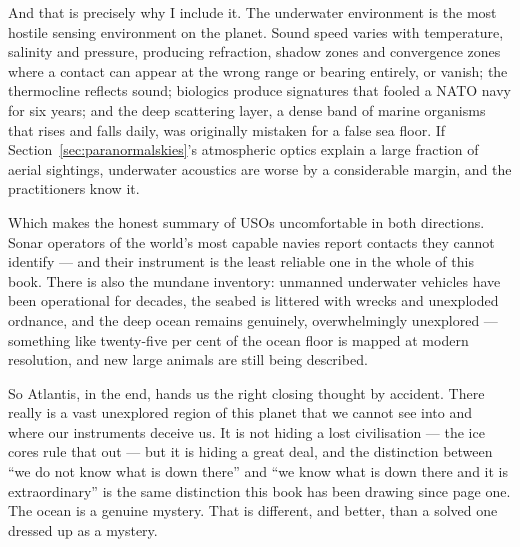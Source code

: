 And that is precisely why I include it. The underwater environment is the most hostile sensing
environment on the planet. Sound speed varies with temperature, salinity and pressure, producing
refraction, shadow zones and convergence zones where a contact can appear at the wrong range or
bearing entirely, or vanish; the thermocline reflects sound; biologics produce signatures that fooled
a NATO navy for six years; and the deep scattering layer, a dense band of marine organisms that rises
and falls daily, was originally mistaken for a false sea floor. If Section~\ref{sec:paranormalskies}'s atmospheric optics
explain a large fraction of aerial sightings, underwater acoustics are worse by a considerable margin,
and the practitioners know it.

Which makes the honest summary of USOs uncomfortable in both directions. Sonar operators of the
world's most capable navies report contacts they cannot identify --- and their instrument is the least
reliable one in the whole of this book. There is also the mundane inventory: unmanned underwater
vehicles have been operational for decades, the seabed is littered with wrecks and unexploded
ordnance, and the deep ocean remains genuinely, overwhelmingly unexplored --- something like
twenty-five per cent of the ocean floor is mapped at modern resolution, and new large animals are
still being described.

So Atlantis, in the end, hands us the right closing thought by accident. There really is a vast
unexplored region of this planet that we cannot see into and where our instruments deceive us. It is
not hiding a lost civilisation --- the ice cores rule that out --- but it is hiding a great deal, and
the distinction between ``we do not know what is down there'' and ``we know what is down there and it
is extraordinary'' is the same distinction this book has been drawing since page one. The ocean is a
genuine mystery. That is different, and better, than a solved one dressed up as a mystery.
